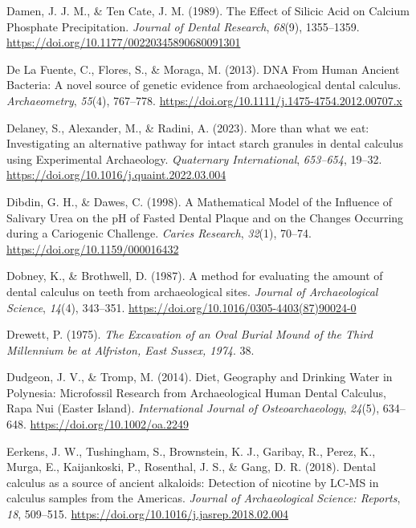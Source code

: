 \documentclass[
  b5paper,
]{book}
\newlength{\cslhangindent}
\newlength{\cslentryspacingunit} %
\newenvironment{CSLReferences}[2] %
 {%
  \setlength{\parindent}{0pt}
  \ifodd #1
  \let\oldpar\par
  \def\par{\hangindent=\cslhangindent\oldpar}
  \fi
  \setlength{\parskip}{#2\cslentryspacingunit}
 }%
 {}
\begin{document}
\begin{CSLReferences}{1}{0}
\leavevmode{}%
Damen, J. J. M., \& Ten Cate, J. M. (1989). The {Effect} of {Silicic
Acid} on {Calcium Phosphate Precipitation}. \emph{Journal of Dental
Research}, \emph{68}(9), 1355--1359.
\url{https://doi.org/10.1177/00220345890680091301}

\leavevmode{}%
De La Fuente, C., Flores, S., \& Moraga, M. (2013). {DNA From Human
Ancient Bacteria}: {A} novel source of genetic evidence from
archaeological dental calculus. \emph{Archaeometry}, \emph{55}(4),
767--778. \url{https://doi.org/10.1111/j.1475-4754.2012.00707.x}

\leavevmode{}%
Delaney, S., Alexander, M., \& Radini, A. (2023). More than what we eat:
{Investigating} an alternative pathway for intact starch granules in
dental calculus using {Experimental Archaeology}. \emph{Quaternary
International}, \emph{653--654}, 19--32.
\url{https://doi.org/10.1016/j.quaint.2022.03.004}

\leavevmode{}%
Dibdin, G. H., \& Dawes, C. (1998). A {Mathematical Model} of the
{Influence} of {Salivary Urea} on the {pH} of {Fasted Dental Plaque} and
on the {Changes Occurring} during a {Cariogenic Challenge}. \emph{Caries
Research}, \emph{32}(1), 70--74. \url{https://doi.org/10.1159/000016432}

\leavevmode{}%
Dobney, K., \& Brothwell, D. (1987). A method for evaluating the amount
of dental calculus on teeth from archaeological sites. \emph{Journal of
Archaeological Science}, \emph{14}(4), 343--351.
\url{https://doi.org/10.1016/0305-4403(87)90024-0}

\leavevmode{}%
Drewett, P. (1975). \emph{The {Excavation} of an {Oval Burial Mound} of
the {Third Millennium} be at {Alfriston}, {East Sussex}, 1974}. 38.

\leavevmode{}%
Dudgeon, J. V., \& Tromp, M. (2014). Diet, {Geography} and {Drinking
Water} in {Polynesia}: {Microfossil Research} from {Archaeological Human
Dental Calculus}, {Rapa Nui} ({Easter Island}). \emph{International
Journal of Osteoarchaeology}, \emph{24}(5), 634--648.
\url{https://doi.org/10.1002/oa.2249}

\leavevmode{}%
Eerkens, J. W., Tushingham, S., Brownstein, K. J., Garibay, R., Perez,
K., Murga, E., Kaijankoski, P., Rosenthal, J. S., \& Gang, D. R. (2018).
Dental calculus as a source of ancient alkaloids: {Detection} of
nicotine by {LC-MS} in calculus samples from the {Americas}.
\emph{Journal of Archaeological Science: Reports}, \emph{18}, 509--515.
\url{https://doi.org/10.1016/j.jasrep.2018.02.004}


\end{CSLReferences}
\end{document}
